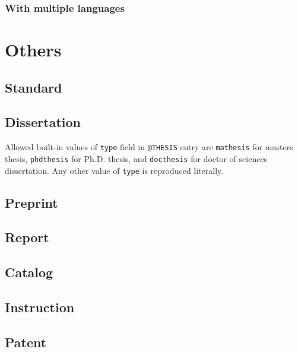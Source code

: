 \documentclass[a4paper]{article}
\begin{document}
\subsubsection{With multiple languages}


\section{Others}

\subsection{Standard}

\subsection{Dissertation}
Allowed built-in values of \verb|type| field in \verb|@THESIS| entry are \verb|mathesis| for masters thesis, \verb|phdthesis| for Ph.D. thesis, and \verb|docthesis| for doctor of sciences dissertation. Any other value of \verb|type| is reproduced literally.

\subsection{Preprint}

\subsection{Report}

\subsection{Catalog}

\subsection{Instruction}

\subsection{Patent}
\end{document}
